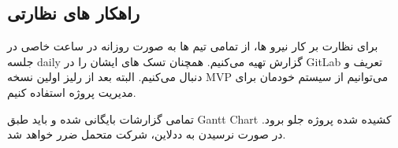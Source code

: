 \subsection{راهکار های نظارتی}

برای نظارت بر کار نیرو ها، از تمامی تیم ها به صورت روزانه در ساعت خاصی در جلسه daily گزارش تهیه می‌کنیم. همچنان تسک های ایشان را در GitLab تعریف و دنبال می‌کنیم.
البته بعد از رلیز اولین نسخه MVP می‌توانیم از سیستم خودمان برای مدیریت پروژه استفاده کنیم.

تمامی گزارشات بایگانی شده و باید طبق Gantt Chart کشیده شده پروژه جلو برود. در صورت نرسیدن به ددلاین، شرکت متحمل ضرر خواهد شد.
